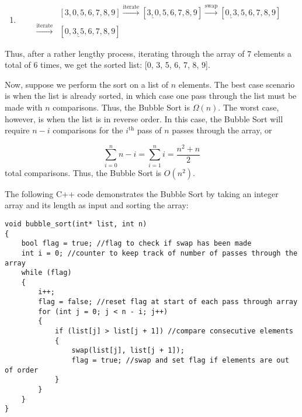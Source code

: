 \documentclass[a4paper]{article}
\begin{document}
\begin{enumerate}
\item
\begin{align*}
&[3,0,5,6,7,8,9]\xrightarrow{\text{iterate}}[\underline{3,0},5,6,7,8,9]\xrightarrow{\text{swap}}[\underline{0,3},5,6,7,8,9]\\
\xrightarrow{\text{iterate}}&[0,\underline{3,5},6,7,8,9]
\end{align*}
\end{enumerate}

Thus, after a rather lengthy process, iterating through the array of 7 elements a total of 6 times, we get the sorted list: [0, 3, 5, 6, 7, 8, 9]. 

Now, suppose we perform the sort on a list of $n$ elements. The best case scenario is when the list is already sorted, in which case one pass through the list must be made with $n$ comparisons. Thus, the Bubble Sort is $\Omega(n)$. The worst case, however, is when the list is in reverse order. In this case, the Bubble Sort will require $n - i$ comparisons for the $i^{\text{th}}$ pass of $n$ passes through the array, or

\[\sum_{i=0}^n n-i=\sum_{i=1}^n i=\frac{n^2+n}{2}\]total comparisons. Thus, the Bubble Sort is $O(n^2)$. 

The following C++ code demonstrates the Bubble Sort by taking an integer array and its length as input and sorting the array:

\begin{verbatim}
void bubble_sort(int* list, int n)
{
	bool flag = true; //flag to check if swap has been made
	int i = 0; //counter to keep track of number of passes through the array
	while (flag)
	{
		i++;
		flag = false; //reset flag at start of each pass through array
		for (int j = 0; j < n - i; j++)
		{
			if (list[j] > list[j + 1]) //compare consecutive elements
			{
				swap(list[j], list[j + 1]); 
				flag = true; //swap and set flag if elements are out of order
			}
		}
	}
}
\end{verbatim}
\end{document}
